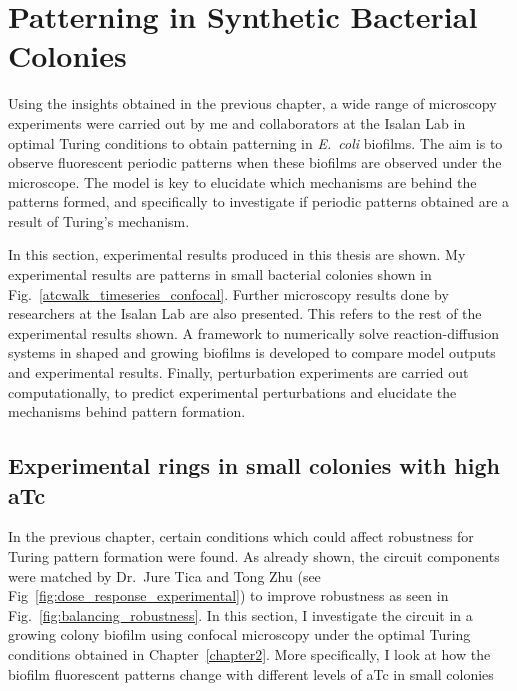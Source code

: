 \chapter{Patterning in Synthetic Bacterial Colonies} \label{chapter3}
Using the insights obtained in the previous chapter, a wide range of microscopy experiments were carried out by me and collaborators at the Isalan Lab in optimal Turing conditions to obtain patterning in \textit{E.~coli} biofilms.
The aim is to observe fluorescent periodic patterns when these biofilms are observed under the microscope.
The model is key to elucidate which mechanisms are behind the patterns formed, and specifically to investigate if periodic patterns obtained are a result of Turing's mechanism.

In this section, experimental results produced in this thesis are shown.
My experimental results are patterns in small bacterial colonies shown in Fig.~\ref{atcwalk_timeseries_confocal}.
Further microscopy results done by researchers at the Isalan Lab are also presented. This refers to the rest of the experimental results shown.
A framework to numerically solve reaction-diffusion systems in shaped and growing biofilms is developed to compare model outputs and experimental results.
Finally, perturbation experiments are carried out computationally, to predict experimental perturbations and elucidate the mechanisms behind pattern formation.

\section{Experimental rings in small colonies with high aTc}\label{Rings in small colonies with high aTc}
In the previous chapter, certain conditions which could affect robustness for Turing pattern formation were found.
As already shown, the circuit components were matched by Dr.~Jure Tica and Tong Zhu (see Fig~\ref{fig:dose_response_experimental}) to improve robustness as seen in Fig.~\ref{fig:balancing_robustness}.
In this section, I investigate the circuit in a growing colony biofilm using confocal microscopy under the optimal Turing conditions obtained in Chapter~\ref{chapter2}.
More specifically, I look at how the biofilm fluorescent patterns change with different levels of aTc in small colonies

